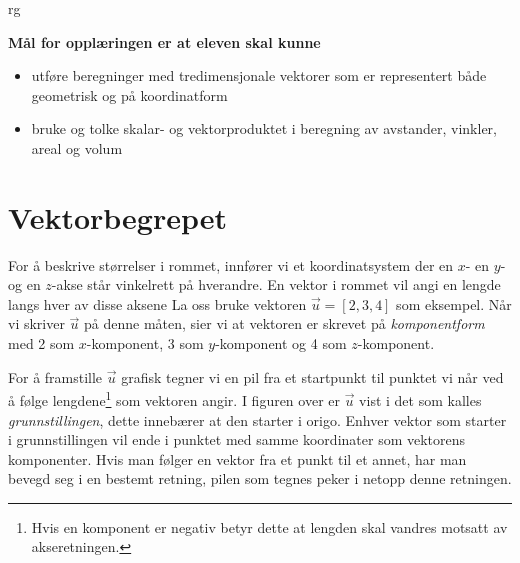



{rg}
\eqlen	
\begin{comment}
	I matematikk R1 studerte vi vektorer i planet og brukte da et koordinatsystem med en $ x $- og en $ y $-akse. Vi skal nå gå et skritt videre og innføre også en $ z $-akse som står vinkelrett på de to andre. Vi får da en vektor som kan gå i tre retninger, og vi sier da at vi befinner oss i \textit{rommet}. 
	
	Om vi ønsker å studere krefter som virker på gjenstander er det vektorer i rommet vi bruker for å beskrive disse. Dette emnet spiller derfor en stor rolle uansett om det er bevegelsen til bakterier, biler eller fly man ønsker å undersøke. \\
\end{comment}

\textbf{Mål for opplæringen er at eleven skal kunne}
\begin{itemize}
	\item utføre beregninger med tredimensjonale vektorer som er representert både geometrisk og på koordinatform
\item bruke og tolke skalar- og vektorproduktet i beregning av avstander, vinkler, areal og volum
\end{itemize}
\newpage	
\section{Vektorbegrepet}
For å beskrive størrelser i rommet, innfører vi et koordinatsystem der en $ x$- en $ y $- og en $ z $-akse står vinkelrett på hverandre. En vektor i rommet vil angi en lengde langs hver av disse aksene La oss bruke vektoren $ \vec{u}=[2, 3, 4] $ som eksempel. Når vi skriver $ \vec{u} $ på denne måten, sier vi at vektoren er skrevet på \textit{komponentform} med 2 som $ x $-komponent, 3 som $ y $-komponent og 4 som $ z $-komponent. \vsk

For å framstille $ \vec{u} $ grafisk tegner vi en pil fra et startpunkt til punktet vi når ved å følge lengdene\footnote{Hvis en komponent er negativ betyr dette at lengden skal vandres motsatt av akseretningen.} som vektoren angir.
I figuren over er $ \vec{u} $ vist i det som kalles \textit{grunnstillingen}, dette innebærer at den starter i origo. Enhver vektor som starter i grunnstillingen vil ende i punktet med samme koordinater som vektorens komponenter. Hvis man følger en vektor fra et punkt til et annet, har man bevegd seg i en bestemt retning, pilen som tegnes peker i netopp denne retningen. \newpage

